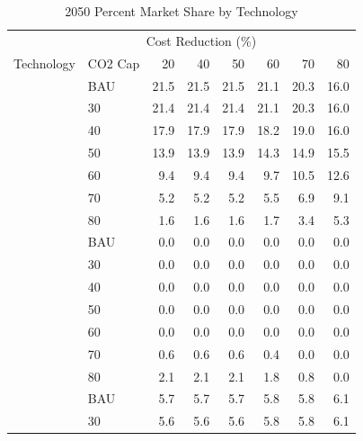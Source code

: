 \documentclass[]{article}
\begin{document}
\begin{longtable}{>{\raggedright\arraybackslash}p{2 cm}lrrrrrr}
\caption{\label{tab:unnamed-chunk-3}2050 Percent Market Share by Technology}\\
\toprule
\multicolumn{2}{c}{ } & \multicolumn{6}{c}{Cost Reduction (\%)} \\
\cmidrule(l{3pt}r{3pt}){3-8}
Technology & CO2 Cap & 20 & 40 & 50 & 60 & 70 & 80\\
\midrule
\rowcolor{gray!6}   & BAU & 21.5 & 21.5 & 21.5 & 21.1 & 20.3 & 16.0\\

 & 30 & 21.4 & 21.4 & 21.4 & 21.1 & 20.3 & 16.0\\

\rowcolor{gray!6}   & 40 & 17.9 & 17.9 & 17.9 & 18.2 & 19.0 & 16.0\\

 & 50 & 13.9 & 13.9 & 13.9 & 14.3 & 14.9 & 15.5\\

\rowcolor{gray!6}   & 60 & 9.4 & 9.4 & 9.4 & 9.7 & 10.5 & 12.6\\

 & 70 & 5.2 & 5.2 & 5.2 & 5.5 & 6.9 & 9.1\\

\rowcolor{gray!6}  \multirow{-7}{2 cm}{\raggedright\arraybackslash Coal} & 80 & 1.6 & 1.6 & 1.6 & 1.7 & 3.4 & 5.3\\
\cmidrule{1-8}
 & BAU & 0.0 & 0.0 & 0.0 & 0.0 & 0.0 & 0.0\\

\rowcolor{gray!6}   & 30 & 0.0 & 0.0 & 0.0 & 0.0 & 0.0 & 0.0\\

 & 40 & 0.0 & 0.0 & 0.0 & 0.0 & 0.0 & 0.0\\

\rowcolor{gray!6}   & 50 & 0.0 & 0.0 & 0.0 & 0.0 & 0.0 & 0.0\\

 & 60 & 0.0 & 0.0 & 0.0 & 0.0 & 0.0 & 0.0\\

\rowcolor{gray!6}   & 70 & 0.6 & 0.6 & 0.6 & 0.4 & 0.0 & 0.0\\

\multirow{-7}{2 cm}{\raggedright\arraybackslash Coal CCS} & 80 & 2.1 & 2.1 & 2.1 & 1.8 & 0.8 & 0.0\\
\cmidrule{1-8}
\rowcolor{gray!6}   & BAU & 5.7 & 5.7 & 5.7 & 5.8 & 5.8 & 6.1\\

 & 30 & 5.6 & 5.6 & 5.6 & 5.8 & 5.8 & 6.1\\


\end{longtable}
\end{document}
